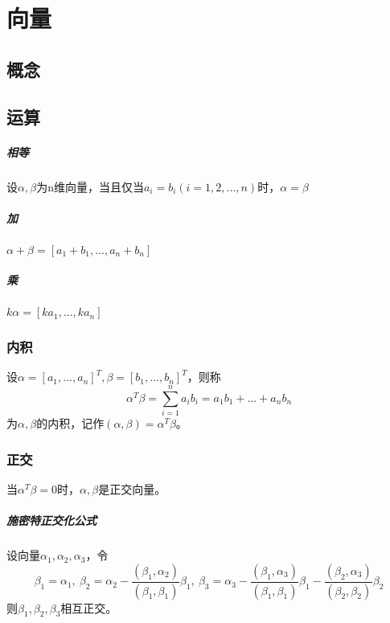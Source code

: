 
\chapter{向量}


\section{概念}

\section{运算}

\paragraph{相等}
设\(\alpha,\beta\)为n维向量，当且仅当\(a_i = b_i(i = 1,2,...,n)\)时，\(\alpha = \beta\)


\paragraph{加}
\(\alpha + \beta = [a_1 + b_1, ..., a_n + b_n]\)


\paragraph{乘}
\(k\alpha = [ka_1, ..., ka_n]\)


\subsection{内积}
设\(\alpha = [a_1, ..., a_n]^T, \beta = [b_1, ..., b_n]^T\)，则称\[\alpha^T\beta = \sum_{i = 1}^{n} a_ib_i = a_1b_1 + ... + a_nb_n\]为\(\alpha, \beta\)的内积，记作\((\alpha, \beta) = \alpha^T\beta\)。


\subsection{正交}
当\(\alpha^T\beta = 0\)时，\(\alpha, \beta\)是正交向量。

\paragraph{施密特正交化公式}
设向量\(\alpha_1, \alpha_2, \alpha_3\)，令
\[\beta_1 = \alpha_1,\ \beta_2 = \alpha_2 - \dfrac{(\beta_1, \alpha_2)}{(\beta_1, \beta_1)}\beta_1,\ \beta_3 = \alpha_3 - \dfrac{(\beta_1, \alpha_3)}{(\beta_1, \beta_1)}\beta_1 - \dfrac{(\beta_2, \alpha_3)}{(\beta_2, \beta_2)}\beta_2\]
则\(\beta_1, \beta_2, \beta_3\)相互正交。



